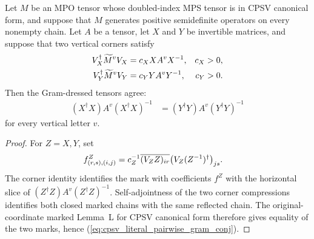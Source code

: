 \begin{lemma}
    \label{thm:cpsv_literal_pairwise_vertical_gram_conjugation}
    \leanok
    Let $M$ be an MPO tensor whose doubled-index MPS tensor is in
    CPSV canonical form, and suppose that $M$ generates positive semidefinite
    operators on every nonempty chain. Let $A$ be a tensor, let $X$ and $Y$ be
    invertible matrices, and suppose that two vertical corners satisfy
    \begin{align}
        V_X^\dagger\widetilde M^vV_X
            & =c_X X A^vX^{-1},
            &
        c_X & >0,
        \notag                  \\
        V_Y^\dagger\widetilde M^vV_Y
            & =c_Y Y A^vY^{-1},
            &
        c_Y & >0.
        \notag
    \end{align}
    Then the Gram-dressed tensors agree:
    \begin{align}
        (X^\dagger X)A^v(X^\dagger X)^{-1}
         & =(Y^\dagger Y)A^v(Y^\dagger Y)^{-1}
        \label{eq:cpsv_literal_pairwise_gram_conj}
    \end{align}
    for every vertical letter $v$.
\end{lemma}

\begin{proof}\leanok
    For $Z=X,Y$, set
    \begin{align}
        f^Z_{(r,s),(i,j)}
         & =c_Z^{-1}\overline{(V_Z Z)_{ir}}
        \bigl(V_Z(Z^{-1})^\dagger\bigr)_{js}.
        \notag
    \end{align}
    The corner identity identifies the mark with coefficients $f^Z$ with the
    horizontal slice of $(Z^\dagger Z)A^v(Z^\dagger Z)^{-1}$.
    Self-adjointness of the two corner compressions identifies both closed
    marked chains with the same reflected chain. The original-coordinate
    marked Lemma~L for CPSV canonical form therefore gives equality of the
    two marks, hence (\ref{eq:cpsv_literal_pairwise_gram_conj}).
\end{proof}

